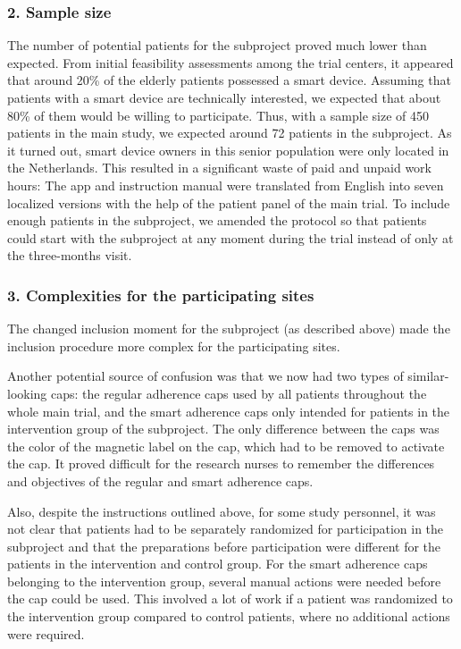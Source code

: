 \documentclass{article}
\begin{document}
\subsubsection{2. Sample size}

The number of potential patients for the subproject proved much lower than expected. From initial feasibility assessments among the trial centers, it appeared that around 20\% of the elderly patients possessed a smart device. Assuming that patients with a smart device are technically interested, we expected that about 80\% of them would be willing to participate. Thus, with a sample size of 450 patients in the main study, we expected around 72 patients in the subproject. As it turned out, smart device owners in this senior population were only located in the Netherlands. This resulted in a significant waste of paid and unpaid work hours: The app and instruction manual were translated from English into seven localized versions with the help of the patient panel of the main trial. To include enough patients in the subproject, we amended the protocol so that patients could start with the subproject at any moment during the trial instead of only at the three-months visit. 



\subsubsection{3. Complexities for the participating sites}

The changed inclusion moment for the subproject (as described above) made the inclusion procedure more complex for the participating sites. 

Another potential source of confusion was that we now had two types of similar-looking caps: the regular adherence caps used by all patients throughout the whole main trial, and the smart adherence caps only intended for patients in the intervention group of the subproject. The only difference between the caps was the color of the magnetic label on the cap, which had to be removed to activate the cap. It proved difficult for the research nurses to remember the differences and objectives of the regular and smart adherence caps. 



Also, despite the instructions outlined above, for some study personnel, it was not clear that patients had to be separately randomized for participation in the subproject and that the preparations before participation were different for the patients in the intervention and control group. For the smart adherence caps belonging to the intervention group, several manual actions were needed before the cap could be used. This involved a lot of work if a patient was randomized to the intervention group compared to control patients, where no additional actions were required. 
\end{document}
